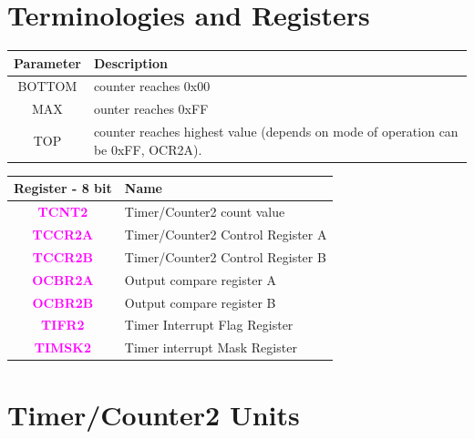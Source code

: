 \documentclass{article}
\newcommand{\regFormat}[1]{\textbf{\textcolor{magenta}{#1}}}
\begin{document}
\section{Terminologies and Registers}
\begin{minipage}{0.45\textwidth}
    \begin{tabular}{c|p{5.5cm}}
        \textbf{Parameter} & \textbf{Description}\\
        \hline
        BOTTOM & counter reaches 0x00\\
        MAX & ounter reaches 0xFF\\
        TOP & counter reaches highest value (depends on mode of operation can be 0xFF, OCR2A).        
    \end{tabular}
\end{minipage}
\begin{minipage}{0.5\textwidth}
    \begin{tabular}{c|p{6cm}}
        \textbf{Register - 8 bit} & \textbf{Name}\\
        \hline
        \regFormat{TCNT2} & Timer/Counter2 count value\\
        \regFormat{TCCR2A} & Timer/Counter2 Control Register A\\
        \regFormat{TCCR2B} & Timer/Counter2 Control Register B\\
        \regFormat{OCBR2A} & Output compare register A\\
        \regFormat{OCBR2B} & Output compare register B\\
        \regFormat{TIFR2} & Timer Interrupt Flag Register\\
        \regFormat{TIMSK2} & Timer interrupt Mask Register\\
    \end{tabular}
\end{minipage}

\section{Timer/Counter2 Units}
\end{document}
